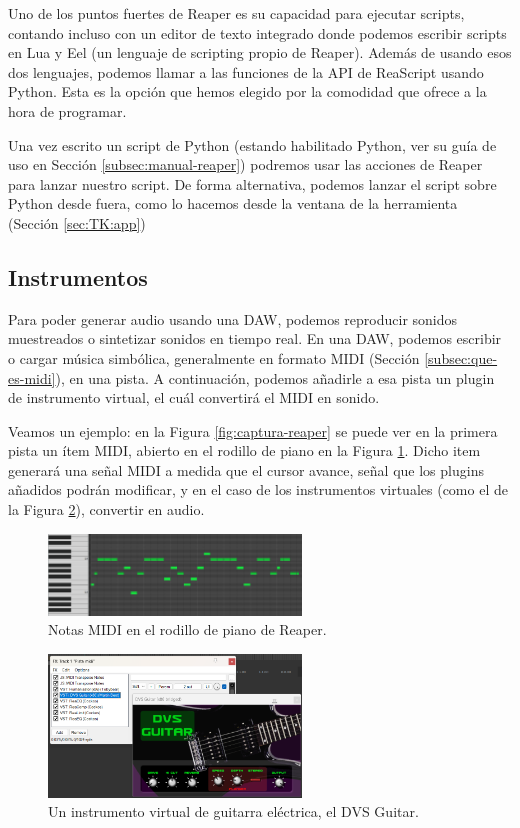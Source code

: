 Uno de los puntos fuertes de Reaper es su capacidad para ejecutar scripts, contando incluso con un editor de texto integrado donde podemos escribir scripts en Lua y Eel (un lenguaje de scripting propio de Reaper). Además de usando esos dos lenguajes, podemos llamar a las funciones de la API de ReaScript usando Python. Esta es la opción que hemos elegido por la comodidad que ofrece a la hora de programar.

Una vez escrito un script de Python (estando habilitado Python, ver su guía de uso en Sección \ref{subsec:manual-reaper}) podremos usar las acciones de Reaper para lanzar nuestro script. De forma alternativa, podemos lanzar el script sobre Python desde fuera, como lo hacemos desde la ventana de la herramienta (Sección \ref{sec:TK:app})

\subsection{Instrumentos}
Para poder generar audio usando una DAW, podemos reproducir sonidos muestreados o sintetizar sonidos en tiempo real. En una DAW, podemos escribir o cargar música simbólica, generalmente en formato MIDI (Sección \ref{subsec:que-es-midi}), en una pista. A continuación, podemos añadirle a esa pista un plugin de instrumento virtual, el cuál convertirá el MIDI en sonido.

Veamos un ejemplo: en la Figura \ref{fig:captura-reaper} se puede ver en la primera pista un ítem MIDI, abierto en el rodillo de piano en la Figura \ref{fig:rodillo-midi}. Dicho item generará una señal MIDI a medida que el cursor avance, señal que los plugins añadidos podrán modificar, y en el caso de los instrumentos virtuales (como el de la Figura \ref{fig:plugin-dvs}), convertir en audio.


\begin{figure}[h]
    \centering
    \includegraphics[width = 0.6\textwidth]{Imagenes/Bitmap/itemMidiAmpliado.png}
    \caption{Notas MIDI en el rodillo de piano de Reaper.}
    \label{fig:rodillo-midi}
\end{figure}

\begin{figure}[h]
    \centering
    \includegraphics[width = 0.6\textwidth]{Imagenes/Bitmap/dvs.png}
    \caption{Un instrumento virtual de guitarra eléctrica, el DVS Guitar.}
    \label{fig:plugin-dvs}
\end{figure}


